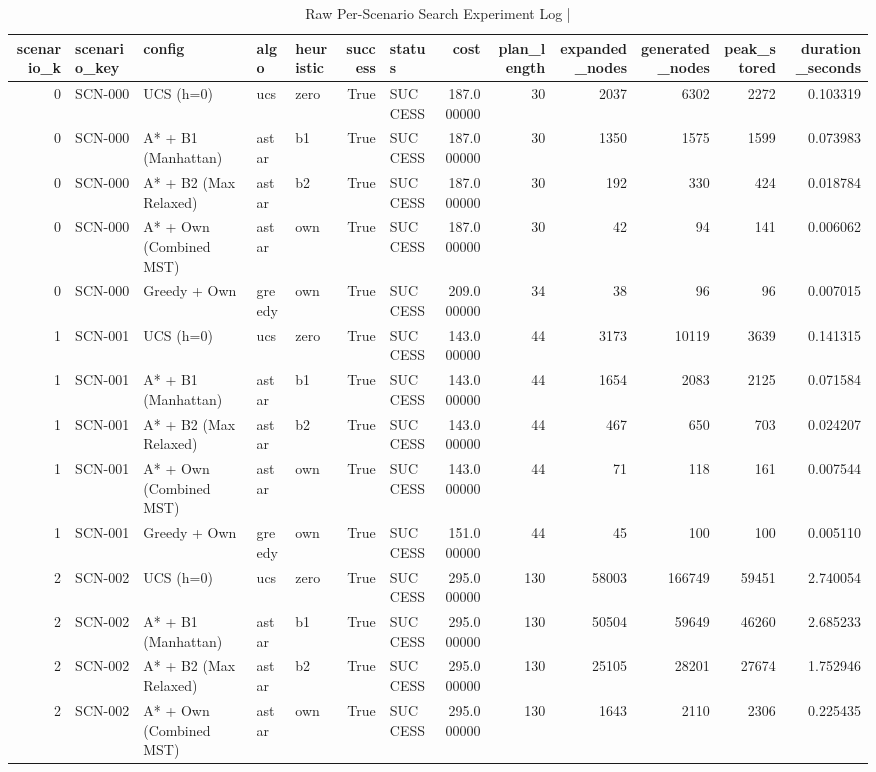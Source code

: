 \begin{table}[htbp]
\centering
\caption{Raw Per-Scenario Search Experiment Log | \stampline}
\label{tab:partB_heuristics_raw}
\begin{tabular}{rllllrlrrrrrr}
\toprule
scenario\_k & scenario\_key & config & algo & heuristic & success & status & cost & plan\_length & expanded\_nodes & generated\_nodes & peak\_stored & duration\_seconds \\
\midrule
0 & SCN-000 & UCS (h=0) & ucs & zero & True & SUCCESS & 187.000000 & 30 & 2037 & 6302 & 2272 & 0.103319 \\
0 & SCN-000 & A* + B1 (Manhattan) & astar & b1 & True & SUCCESS & 187.000000 & 30 & 1350 & 1575 & 1599 & 0.073983 \\
0 & SCN-000 & A* + B2 (Max Relaxed) & astar & b2 & True & SUCCESS & 187.000000 & 30 & 192 & 330 & 424 & 0.018784 \\
0 & SCN-000 & A* + Own (Combined MST) & astar & own & True & SUCCESS & 187.000000 & 30 & 42 & 94 & 141 & 0.006062 \\
0 & SCN-000 & Greedy + Own & greedy & own & True & SUCCESS & 209.000000 & 34 & 38 & 96 & 96 & 0.007015 \\
1 & SCN-001 & UCS (h=0) & ucs & zero & True & SUCCESS & 143.000000 & 44 & 3173 & 10119 & 3639 & 0.141315 \\
1 & SCN-001 & A* + B1 (Manhattan) & astar & b1 & True & SUCCESS & 143.000000 & 44 & 1654 & 2083 & 2125 & 0.071584 \\
1 & SCN-001 & A* + B2 (Max Relaxed) & astar & b2 & True & SUCCESS & 143.000000 & 44 & 467 & 650 & 703 & 0.024207 \\
1 & SCN-001 & A* + Own (Combined MST) & astar & own & True & SUCCESS & 143.000000 & 44 & 71 & 118 & 161 & 0.007544 \\
1 & SCN-001 & Greedy + Own & greedy & own & True & SUCCESS & 151.000000 & 44 & 45 & 100 & 100 & 0.005110 \\
2 & SCN-002 & UCS (h=0) & ucs & zero & True & SUCCESS & 295.000000 & 130 & 58003 & 166749 & 59451 & 2.740054 \\
2 & SCN-002 & A* + B1 (Manhattan) & astar & b1 & True & SUCCESS & 295.000000 & 130 & 50504 & 59649 & 46260 & 2.685233 \\
2 & SCN-002 & A* + B2 (Max Relaxed) & astar & b2 & True & SUCCESS & 295.000000 & 130 & 25105 & 28201 & 27674 & 1.752946 \\
2 & SCN-002 & A* + Own (Combined MST) & astar & own & True & SUCCESS & 295.000000 & 130 & 1643 & 2110 & 2306 & 0.225435 \\

\end{tabular}
\end{table}
